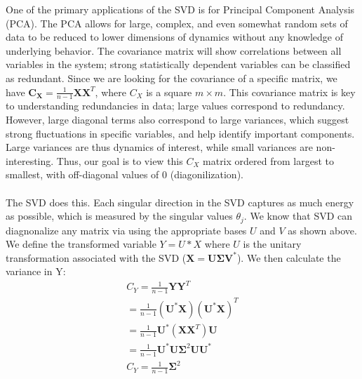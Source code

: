\documentclass{article}
\begin{document}
	One of the primary applications of the SVD is for Principal Component Analysis (PCA). The PCA allows for large, complex, and even somewhat random sets of data to be reduced to lower dimensions of dynamics without any knowledge of underlying behavior. 
	The covariance matrix will show correlations between all variables in the system; strong statistically dependent variables can be classified as redundant. Since we are looking for the covariance of a specific matrix, we have $\mathbf { C } _ { \mathbf { X } } = \frac { 1 } { n - 1 } \mathbf { X X } ^ { T }$, where $C_X$ is a square $m \times m$. This covariance matrix is key to understanding redundancies in data; large values correspond to redundancy. However, large diagonal terms also correspond to large variances, which suggest strong fluctuations in specific variables, and help identify important components. Large variances are thus dynamics of interest, while small variances are non-interesting. Thus, our goal is to view this $C_X$ matrix ordered from largest to smallest, with off-diagonal values of 0 (diagonilization). \\ \\
	The SVD does this. Each singular direction in the SVD captures as much energy as possible, which is measured by the singular values $\theta_j$.  We know that SVD can diagnonalize any matrix via using the appropriate bases $U$ and $V$ as shown above. We define the transformed variable $Y = U*X$ where $U$ is the unitary transformation associated with the SVD ($\mathbf { X } = \mathbf { U } \boldsymbol { \Sigma } \mathbf { V } ^ { * }$). We then calculate the variance in Y:
 \begin{align*}
C_Y = \frac { 1 } { n - 1 } \mathbf { Y } \mathbf { Y } ^ { T }\\
= \frac { 1 } { n - 1 } \left( \mathbf { U } ^ { * } \mathbf { X } \right) \left( \mathbf { U } ^ { * } \mathbf { X } \right) ^ { T } \\
= \frac { 1 } { n - 1 } \mathbf { U } ^ { * } \left( \mathbf { X } \mathbf { X } ^ { T } \right) \mathbf { U } \\
= \frac { 1 } { n - 1 } \mathbf { U } ^ { * } \mathbf { U } \boldsymbol { \Sigma } ^ { 2 } \mathbf { U } \mathbf { U } ^ { * } \\
C_Y= \frac { 1 } { n - 1 } \mathbf { \Sigma } ^ { 2 }
\end{align*}
\end{document}
